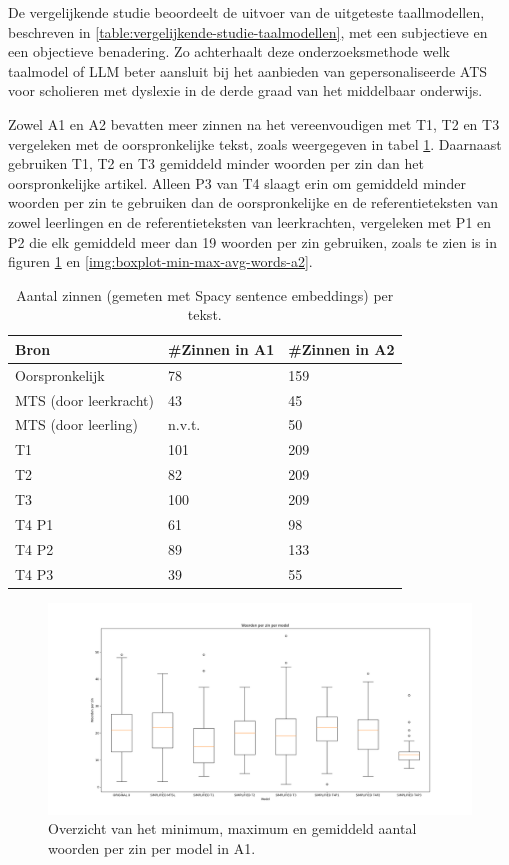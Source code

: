 De vergelijkende studie beoordeelt de uitvoer van de uitgeteste taallmodellen, beschreven in \ref{table:vergelijkende-studie-taalmodellen}, met een subjectieve en een objectieve benadering. Zo achterhaalt deze onderzoeksmethode welk taalmodel of LLM beter aansluit bij het aanbieden van gepersonaliseerde ATS voor scholieren met dyslexie in de derde graad van het middelbaar onderwijs. 

\medspace

Zowel A1 en A2 bevatten meer zinnen na het vereenvoudigen met T1, T2 en T3 vergeleken met de oorspronkelijke tekst, zoals weergegeven in tabel \ref{table:resultaten-aantal-zinnen}. Daarnaast gebruiken T1, T2 en T3 gemiddeld minder woorden per zin dan het oorspronkelijke artikel. Alleen P3 van T4 slaagt erin om gemiddeld minder woorden per zin te gebruiken dan de oorspronkelijke en de referentieteksten van zowel leerlingen en de referentieteksten van leerkrachten, vergeleken met P1 en P2 die elk gemiddeld meer dan 19 woorden per zin gebruiken, zoals te zien is in figuren \ref{img:boxplot-min-max-avg-words-a1} en \ref{img:boxplot-min-max-avg-words-a2}. 

\begin{table}[h]
	\centering
	\begin{tabular}{ | m{3cm} | m{3cm} | m{3cm} | } 
		\hline
		Bron & #Zinnen in A1 & #Zinnen in A2 \\
		\hline
		Oorspronkelijk & 78  & 159 \\ 
		\hline
		MTS (door leerkracht) & 43 & 45 \\
		\hline
		MTS (door leerling) & n.v.t. & 50 \\
		\hline
		T1 & 101 & 209 \\
		\hline
		T2 & 82 & 209 \\
		\hline
		T3 & 100 & 209 \\
		\hline
		T4 P1 & 61 & 98 \\
		\hline
		T4 P2 & 89 & 133 \\
		\hline
		T4 P3 & 39 & 55 \\
		\hline
	\end{tabular}
	\label{table:resultaten-aantal-zinnen}
	\caption{Aantal zinnen (gemeten met Spacy sentence embeddings) per tekst.}
\end{table}

\begin{figure}
	\includegraphics[width=\linewidth]{img/boxplot-avg-a1.png}
	\caption{Overzicht van het minimum, maximum en gemiddeld aantal woorden per zin per model in A1.}
	\label{img:boxplot-min-max-avg-words-a1}
\end{figure}

